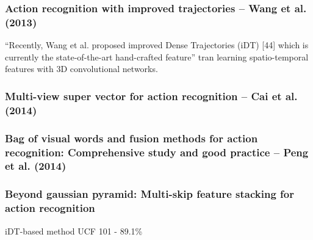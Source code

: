 \subsubsection{Action recognition with improved trajectories -- Wang et al. (2013)}
\cite{wang_action_2013}
``Recently, Wang et al. proposed improved Dense Trajectories (iDT) [44] which is currently the state-of-the-art hand-crafted feature'' tran learning spatio-temporal features with 3D convolutional networks.


\subsubsection{Multi-view super vector for action recognition -- Cai et al. (2014)}
\cite{cai_multi-view_2014}


\subsubsection{Bag of visual words and fusion methods for action recognition: Comprehensive study and good practice -- Peng et al. (2014)}
\cite{peng_bag_2014}


\subsubsection{Beyond gaussian pyramid: Multi-skip feature stacking for action recognition}
iDT-based method
UCF 101 - 89.1\%

